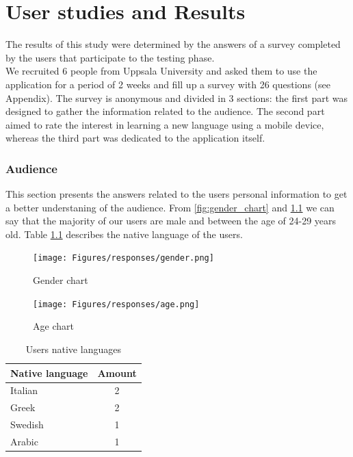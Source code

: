 \chapter{User studies and Results}
\label{chap:results}

The results of this study were determined by the answers of a survey completed by the users that participate to the testing phase. \\
\noindent We recruited 6 people from Uppsala University and asked them to use the application for a period of 2 weeks and fill up a survey with 26 questions (see Appendix). The survey is anonymous and divided in 3 sections: the first part was designed to gather the information related to the audience. The second part aimed to rate the interest in learning a new language using a mobile device, whereas the third part was dedicated to the application itself. \\

\subsection*{Audience}
\label{sub:Audience}

This section presents the answers related to the users personal information to get a better understaning of the audience. From \ref{fig:gender_chart} and \ref{fig:age_chart} we can say that the majority of our users are male and between the age of 24-29 years old.  Table \ref{table:native_languages} describes the native language of the users.

\begin{figure}[!ht]
	\centering
	\begin{minipage}{.5\textwidth}
		\centering
		\texttt{[image: Figures/responses/gender.png]}
		\caption{Gender chart}
		\label{fig:gender_chart}
	\end{minipage}%
	\begin{minipage}{.5\textwidth}
		\centering
		\texttt{[image: Figures/responses/age.png]}
		\caption{Age chart}
		\label{fig:age_chart}
	\end{minipage}
\end{figure}

\begin{table}[!ht]
    \centering
    \begin{tabular}{|l|c|}
        \hline
        \multicolumn{1}{|c|}{\textbf{Native language}} & \textbf{Amount} \\ \hline
        Italian                                        & 2               \\ \hline
        Greek                                          & 2               \\ \hline
        Swedish                                        & 1               \\ \hline
        Arabic                                         & 1               \\ \hline
    \end{tabular}
    \caption{Users native languages}
    \label{table:native_languages}
\end{table}

